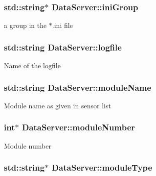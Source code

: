 \hypertarget{classDataServer_a746d543bae3ea60b7c617413951c8e3c}{
\subsubsection[{ini\-Group}]{\setlength{\rightskip}{0pt plus 5cm}std\-::string$\ast$ Data\-Server\-::ini\-Group\hspace{0.3cm}{\ttfamily [private]}}}\label{classDataServer_a746d543bae3ea60b7c617413951c8e3c}
a group in the $\ast$.ini file \hypertarget{classDataServer_ad9f401ae56859aeb3518ca595a9849ad}{
\subsubsection[{logfile}]{\setlength{\rightskip}{0pt plus 5cm}std\-::string Data\-Server\-::logfile\hspace{0.3cm}{\ttfamily [private]}}}\label{classDataServer_ad9f401ae56859aeb3518ca595a9849ad}
Name of the logfile \hypertarget{classDataServer_a38e8fd47db320927a4e7fe20226dc23d}{
\subsubsection[{module\-Name}]{\setlength{\rightskip}{0pt plus 5cm}std\-::string Data\-Server\-::module\-Name\hspace{0.3cm}{\ttfamily [private]}}}\label{classDataServer_a38e8fd47db320927a4e7fe20226dc23d}
Module name as given in sensor list \hypertarget{classDataServer_a4f01751e8d4a8d1ca9fd0e8cbb1240bb}{
\subsubsection[{module\-Number}]{\setlength{\rightskip}{0pt plus 5cm}int$\ast$ Data\-Server\-::module\-Number\hspace{0.3cm}{\ttfamily [private]}}}\label{classDataServer_a4f01751e8d4a8d1ca9fd0e8cbb1240bb}
Module number \hypertarget{classDataServer_ac2f86dedb120b60f6da583a3931f48a7}{
\subsubsection[{module\-Type}]{\setlength{\rightskip}{0pt plus 5cm}std\-::string$\ast$ Data\-Server\-::module\-Type\hspace{0.3cm}{\ttfamily [private]}}}\label{classDataServer_ac2f86dedb120b60f6da583a3931f48a7}
